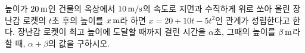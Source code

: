 높이가 $20\mkern3mu \mathrm{m}$인 건물의 옥상에서 $10\mkern3mu \mathrm{m/s}$의 속도로 지면과 수직하게 위로 쏘아 올린 장난감 로켓의 $t$초 후의 높이를 $x\mkern3mu \mathrm{m}$라 하면 $x=20+10t-5t^2$인 관계가 성립한다고 한다. 장난감 로켓이 최고 높이에 도달할 때까지 걸린 시간을 $\alpha$초, 그때의 높이를 $\beta\mkern3mu \mathrm{m}$라 할 때, $\alpha+\beta$의 값을 구하시오.

